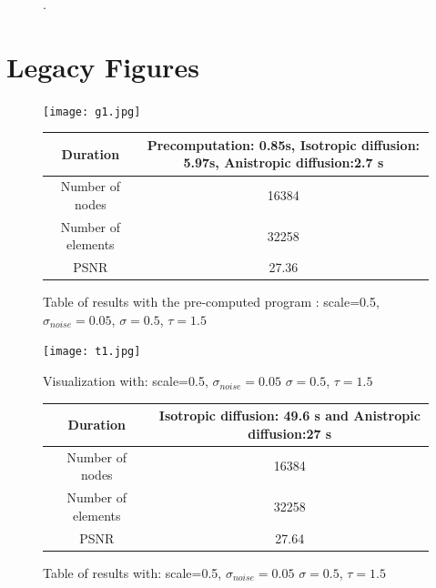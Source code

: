 \documentclass{report}
\begin{document}
\begin{figure}
	\caption{.}
	\label{vis:firsttry}
\end{figure}

\chapter{Legacy Figures}

 \begin{figure}[h!]
 	\label{g1}
 	\centering
 	\texttt{[image: g1.jpg]}
 \end{figure}
 
 
 
          \begin{figure}[h!]
          	\centering
          	\label{T2}
          	\begin{tabular}{|c|c|}
          		\hline
          		Duration &  Precomputation: 0.85s,
          		Isotropic diffusion: 5.97s,
          		Anistropic diffusion:2.7 s   \\
          		\hline
          		Number of nodes & 16384 \\
          		\hline
          		Number of elements & 32258\\
          		
          		\hline
          		PSNR & 27.36 \\
          		\hline
          	\end{tabular}
          	\caption{Table of results with the pre-computed program : scale=0.5, $\sigma_{noise}=0.05$, $\sigma=0.5$, $\tau=1.5$ }
          \end{figure}
          
          
          \begin{figure}[h!]
          	\centering
          	\label{t1}
          	\caption{Visualization with: scale=0.5, $\sigma_{noise}=0.05$  $\sigma=0.5$, $\tau=1.5$ }
          	\texttt{[image: t1.jpg]}
          \end{figure}
          
          \begin{figure}[h!]
          	\caption{Table of results with: scale=0.5, $\sigma_{noise}=0.05$  $\sigma=0.5$, $\tau=1.5$ }
          	\centering
          	\label{T1}
          	\begin{tabular}{|c|c|}
          		\hline
          		Duration &  Isotropic diffusion: 49.6 s
          		and Anistropic diffusion:27 s   \\
          		\hline
          		Number of nodes & 16384 \\
          		\hline
          		Number of elements & 32258\\
          		\hline
          		PSNR & 27.64\\
          		\hline
          	\end{tabular}
          \end{figure}
          
\end{document}

